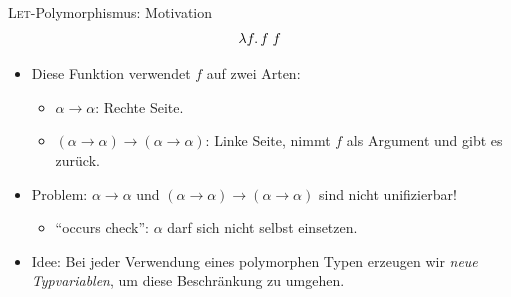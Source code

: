 \documentclass{beamer}
\begin{document}
\begin{frame}{\textsc{Let}-Polymorphismus: Motivation}
  \begin{equation*}
    \lambda f.\, f\;f
  \end{equation*}

  \begin{itemize}
    \item Diese Funktion verwendet $f$ auf zwei Arten:
    \begin{itemize}
      \item $\alpha \to \alpha$: Rechte Seite.
      \item $(\alpha \to \alpha) \to (\alpha \to \alpha)$: Linke Seite, nimmt $f$ als Argument und gibt es zurück.
    \end{itemize}
    \pause
    \item Problem: $\alpha \to \alpha$ und $(\alpha \to \alpha) \to (\alpha \to \alpha)$ sind nicht unifizierbar!
    \begin{itemize}
      \item \enquote{occurs check}: $\alpha$ darf sich nicht selbst einsetzen.
    \end{itemize}
  \item Idee: Bei jeder Verwendung eines polymorphen Typen erzeugen wir \emph{neue Typvariablen}, um diese Beschränkung zu umgehen.
  \end{itemize}
\end{frame}
\end{document}
